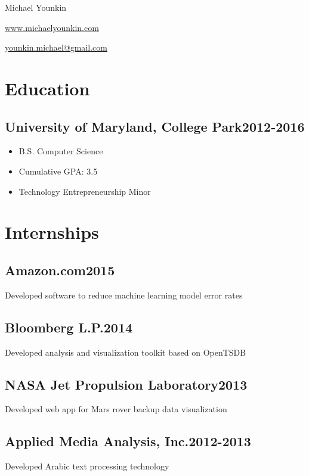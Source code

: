 \documentclass{article}
\newcommand{\subsectiondate}[2]{\subsection*{#1\hfill#2}}
\begin{document}
\begin{center}
    {\LARGE Michael Younkin}

    \href{http://www.michaelyounkin.com}{www.michaelyounkin.com}

    \href{mailto:younkin.michael@gmail.com}{younkin.michael@gmail.com}
\end{center}


\section*{Education}

\subsectiondate{University of Maryland, College Park}{2012-2016}

\begin{itemize}
    \item B.S. Computer Science
    \item Cumulative GPA: 3.5
    \item Technology Entrepreneurship Minor
\end{itemize}


\section*{Internships}

\subsectiondate{Amazon.com}{2015}

Developed software to reduce machine learning model error rates

\subsectiondate{Bloomberg L.P.}{2014}

Developed analysis and visualization toolkit based on OpenTSDB

\subsectiondate{NASA Jet Propulsion Laboratory}{2013}

Developed web app for Mars rover backup data visualization

\subsectiondate{Applied Media Analysis, Inc.}{2012-2013}

Developed Arabic text processing technology


\end{document}
